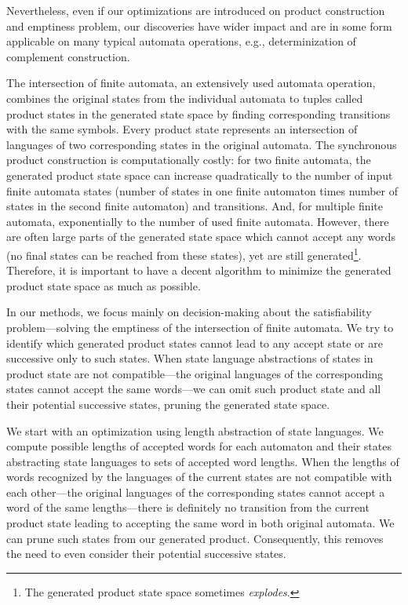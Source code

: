 Nevertheless, even if our optimizations are introduced on product construction and emptiness problem, our discoveries have wider impact and are in some form applicable on many typical automata operations, e.g., determinization of complement construction.


The intersection of finite automata, an extensively used automata operation, combines the original states from the individual automata to tuples called product states in the generated state space by finding corresponding transitions with the same symbols. Every product state represents an intersection of languages of two corresponding states in the original automata. The synchronous product construction is computationally costly: for two finite automata, the generated product state space can increase quadratically to the number of input finite automata states (number of states in one finite automaton times number of states in the second finite automaton) and transitions. And, for multiple finite automata, exponentially to the number of used finite automata. However, there are often large parts of the generated state space which cannot accept any words (no final states can be reached from these states), yet are still generated\footnote{The generated product state space sometimes \emph{explodes}.}. Therefore, it is important to have a decent algorithm to minimize the generated product state space as much as possible.


In our methods, we focus mainly on decision-making about the satisfiability problem---solving the emptiness of the intersection of finite automata. We try to identify which generated product states cannot lead to any accept state or are successive only to such states. When state language abstractions of states in product state are not compatible---the original languages of the corresponding states cannot accept the same words---we can omit such product state and all their potential successive states, pruning the generated state space.


We start with an optimization using length abstraction of state languages. We compute possible lengths of accepted words for each automaton and their states abstracting state languages to sets of accepted word lengths. When the lengths of words recognized by the languages of the current states are not compatible with each other---the original languages of the corresponding states cannot accept a word of the same lengths---there is definitely no transition from the current product state leading to accepting the same word in both original automata. We can prune such states from our generated product. Consequently, this removes the need to even consider their potential successive states.

